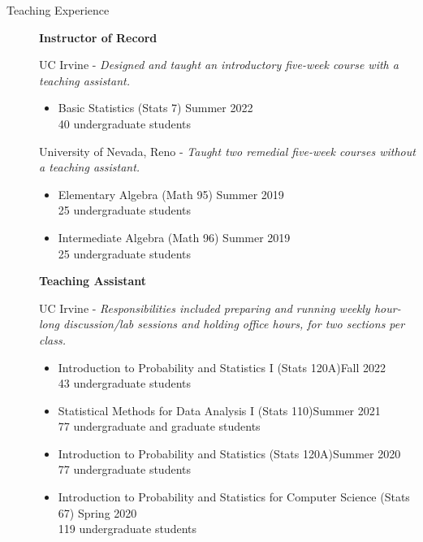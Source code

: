 \documentclass{article}
\begin{document}
	\begin{description}
		\vspace{-2mm}
		\item[Teaching Experience]\hspace*{.1in} 
		
		\textbf{Instructor of Record}
		
		UC Irvine - \textit{Designed and taught an introductory five-week course with a teaching assistant.}
		\begin{itemize}
			\item Basic Statistics (Stats 7) \hfill{Summer 2022}\\
			40 undergraduate students
		\end{itemize}
		
		University of Nevada, Reno - \textit{Taught two remedial five-week courses without a teaching assistant.}
		\begin{itemize}
			\item Elementary Algebra (Math 95) \hfill{Summer 2019}\\
			25 undergraduate students
			
			\item Intermediate Algebra (Math 96) \hfill{Summer 2019}\\
			25 undergraduate students
		\end{itemize}			
		
		\textbf{Teaching Assistant}
		
		UC Irvine - \textit{Responsibilities included preparing and running weekly hour-long discussion/lab sessions and holding office hours, for two sections per class.}
		\begin{itemize}
			\item Introduction to Probability and Statistics I (Stats 120A)\hfill{Fall 2022}\\
			43 undergraduate students
			
			\item Statistical Methods for Data Analysis I (Stats 110)\hfill{Summer 2021}\\
			77 undergraduate and graduate students %
			
			\item Introduction to Probability and Statistics (Stats 120A)\hfill{Summer 2020}\\
			77 undergraduate students %
			
			\item Introduction to Probability and Statistics for Computer Science (Stats 67) \hfill{Spring 2020}\\
			119 undergraduate students %
			

\end{itemize}
\end{description}
\end{document}
